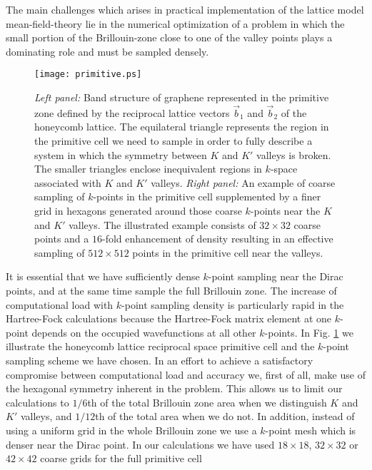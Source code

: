 \documentclass[twocolumn,prb,showpacs,preprintnumbers,amsmath,amssymb]{revtex4}
\begin{document}
The main challenges which arises in 
practical implementation of the lattice model mean-field-theory 
lie in the numerical optimization of a problem in which the small portion of
the Brillouin-zone close to one of the valley points plays a dominating role 
and must be sampled densely. 
\begin{figure}[htbp]
\begin{center}
\texttt{[image: primitive.ps]} 
\caption{
{\em Left panel:}
Band structure of graphene represented in the 
primitive zone defined by the reciprocal lattice vectors $\vec{b}_1$ and $\vec{b}_2$
of the honeycomb lattice.
The equilateral triangle represents the region in the primitive cell we need to sample
in order to fully describe a system in which the symmetry between $K$ and $K'$ valleys
is broken.  The smaller triangles enclose inequivalent regions in $k$-space
associated with $K$ and $K'$ valleys.
{\em Right panel:}
An example of coarse sampling of $k$-points in the primitive cell 
supplemented by a finer grid
in hexagons generated around those coarse $k$-points
near the $K$ and $K'$ valleys. The illustrated example consists of $32 \times 32$
coarse points and a $16$-fold enhancement of density resulting in an effective
sampling of $512 \times 512$ points in the primitive cell near the valleys.
}
\label{primitive}
\end{center}
\end{figure}
It is essential that we have sufficiently dense ${ k}$-point sampling
near the Dirac points, and at the same time sample the full Brillouin zone.
The increase of computational load with ${ k}$-point sampling density is 
particularly rapid in the Hartree-Fock calculations because the Hartree-Fock 
matrix element at one {$ k$}-point depends on the occupied wavefunctions at all other {$ k$}-points. 
In Fig. \ref{primitive} we illustrate 
the honeycomb lattice reciprocal space primitive cell and the $k$-point sampling scheme we have chosen.
In an effort to achieve a satisfactory compromise between
computational load and accuracy we, first of all, make use of the hexagonal symmetry inherent in the problem. 
This allows us to limit our calculations to $1 / 6$th of the total
Brillouin zone area when we distinguish $K$ and $K'$ valleys, and 
$1 / 12$th of the total area when we do not.
In addition, instead of using a uniform grid in the whole Brillouin zone we use a 
{$ k$}-point mesh which is denser near the Dirac point.
In our calculations we have used $18 \times 18$, $32 \times 32$ or $42 \times 42$ coarse grids for the full primitive cell 
\end{document}
